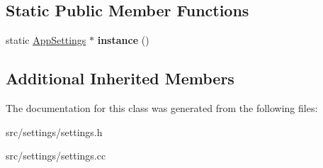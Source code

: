\subsection*{Static Public Member Functions}
\begin{DoxyCompactItemize}
\item 
static \hyperlink{classsettings_1_1AppSettings}{App\+Settings} $\ast$ {\bfseries instance} ()\hypertarget{classsettings_1_1AppSettings_ac17374b3cf0c542fd945dc76a3275167}{}\label{classsettings_1_1AppSettings_ac17374b3cf0c542fd945dc76a3275167}

\end{DoxyCompactItemize}
\subsection*{Additional Inherited Members}


The documentation for this class was generated from the following files\+:\begin{DoxyCompactItemize}
\item 
src/settings/settings.\+h\item 
src/settings/settings.\+cc\end{DoxyCompactItemize}
